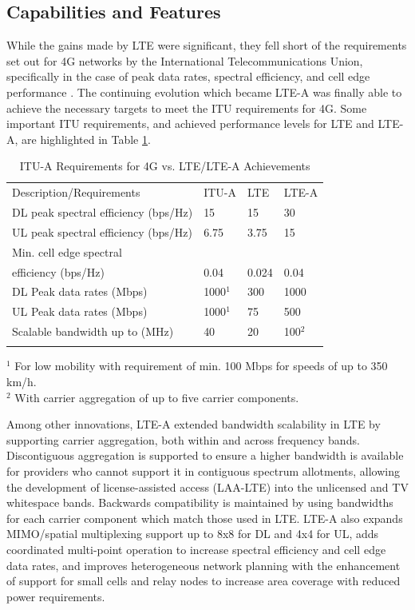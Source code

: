 \subsection{Capabilities and Features}

While the gains made by LTE were significant, they fell short of the requirements set out for 4G networks by the International Telecommunications Union, specifically in the case of peak data rates, spectral efficiency, and cell edge performance \cite{itu-advanced}.  The continuing evolution which became LTE-A was finally able to achieve the necessary targets to meet the ITU requirements for 4G.  Some important ITU requirements, and achieved performance levels for LTE and LTE-A, are highlighted in Table \ref{perf-table}.

\begin{table}
	\caption{ITU-A Requirements for 4G vs. LTE/LTE-A Achievements \cite{lte-3gpp}\cite{lteA-3gpp}\cite{itu-advanced}\cite{abdullah}}
	\label{perf-table}      
	\begin{tabular}{p{}p{}p{}p{}}
		\hline\noalign{\smallskip}
		Description/Requirements & ITU-A & LTE & LTE-A   \\
		\noalign{\smallskip}\svhline\noalign{\smallskip}
		DL peak spectral efficiency (bps/Hz) &  15   & 15  & 30 \\
		UL peak spectral efficiency (bps/Hz)& 6.75  & 3.75  & 15 \\
		Min. cell edge spectral \\ \hspace{0.8em} efficiency (bps/Hz) & 0.04 & 0.024 & 0.04 \\
		DL Peak data rates (Mbps) & 1000$^1$  & 300 & 1000 \\
		UL Peak data rates (Mbps) & 1000$^1$  & 75 & 500 \\
		Scalable bandwidth up to (MHz) & 40 & 20  & 100$^2$ \\
		
		\noalign{\smallskip}\hline\noalign{\smallskip}
	\end{tabular}
	$^1$ For low mobility with requirement of min. 100 Mbps for speeds of up to 350 km/h. 	 \\
	$^2$ With carrier aggregation of up to five carrier components.
\end{table}

Among other innovations, LTE-A extended bandwidth scalability in LTE by supporting carrier aggregation, both within and across frequency bands.   Discontiguous aggregation is supported to ensure a higher bandwidth is available for providers who cannot support it in contiguous spectrum allotments, allowing the development of license-assisted access (LAA-LTE) into the unlicensed and TV whitespace bands.  Backwards compatibility is maintained by using bandwidths for each carrier component which match those used in LTE.  LTE-A also expands MIMO/spatial multiplexing support up to 8x8 for DL and 4x4 for UL, adds coordinated multi-point operation to increase spectral efficiency and cell edge data rates, and improves heterogeneous network planning with the enhancement of support for small cells and relay nodes to increase area coverage with reduced power requirements.

